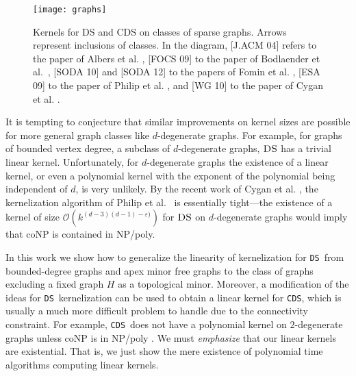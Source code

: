 \documentclass[11pt]{article}
\newcommand{\tDS}{{\texttt{\sc DS}}}
\newcommand{\tCDS}{{\texttt{\sc CDS}}}
\newcommand{\cO}{\mathcal{O}}
\begin{document}
\begin{figure}[t]
\begin{center}
\texttt{[image: graphs]}
\caption{Kernels for DS and CDS on classes of sparse graphs. Arrows represent inclusions of classes.
In the diagram, [J.ACM 04] refers to the paper of Albers et al. \cite{AlberFN04}, [FOCS 09]   to the paper of Bodlaender et al.~\cite{H.Bodlaender:2009ng},
[SODA 10] and [SODA 12] to the papers of Fomin et al. \cite{F.V.Fomin:2010oq,F.V.Fomin:2012},  [ESA 09] to the paper of Philip et al. \cite{PhilipRS09}, and  [WG 10] to the paper of Cygan et al. \cite{Cygan:2010bv}. }
\label{fig:graph_classes}
\end{center}
\end{figure}

 
 It is tempting to conjecture that similar improvements on kernel sizes are possible for more general graph classes like $d$-degenerate graphs. For example, for graphs of bounded vertex degree, a subclass of $d$-degenerate graphs, $\tDS$ has a trivial linear kernel. Unfortunately,  for $d$-degenerate graphs the existence of a linear kernel, or even a polynomial kernel with the exponent of the polynomial being independent of $d$, is very unlikely. 
   By the recent work of   Cygan et al. \cite{CyganGH12}, the kernelization algorithm of Philip et al.~\cite{PhilipRS09}  is essentially  tight---the existence of a kernel of size  
 $\cO(k^{(d-3)(d-1)-\varepsilon)})$ for  $\tDS$ on $d$-degenerate  graphs would imply that  {\sf coNP} is contained in {\sf NP/poly}.  
 
 In this work we show how to generalize the linearity of kernelization  for \tDS \, from 
 bounded-degree graphs and  apex minor free graphs to the class of graphs excluding a fixed graph $H$ as a topological minor.
  Moreover, a   modification of the ideas for \tDS \, kernelization can be used to obtain a linear kernel for \tCDS, which is usually a much more difficult problem to handle due to the connectivity constraint.  For example, \tCDS \, does not have a polynomial kernel on $2$-degenerate graphs  unless {\sf coNP} is in {\sf NP/poly}    \cite{Cygan:2010bv}. We must {\em emphasize} that our linear kernels are existential. That is, we just show the mere existence of polynomial time algorithms computing linear kernels. 
  
\end{document}
